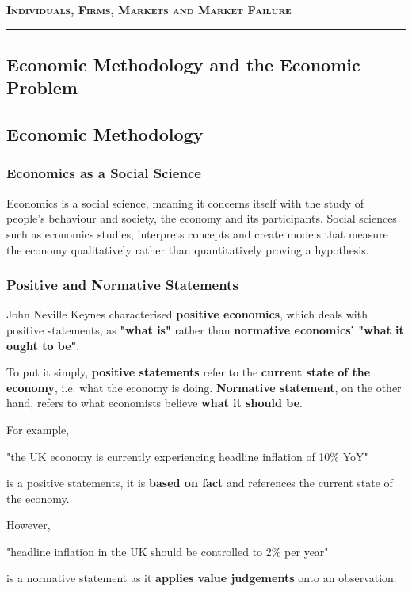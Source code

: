 \documentclass[a4paper,10pt]{article}
\begin{document}
{\LARGE\bfseries\scshape Individuals, Firms, Markets and Market Failure}

\vspace*{1em}\hrule\vspace*{1em}

\begin{multicols}{2}
	\tableofcontents

	\section{Economic Methodology and the Economic Problem}
	\subsection{Economic Methodology}

	\subsubsection{Economics as a Social Science}
	Economics is a social science, meaning it concerns itself with the study of
	people's behaviour and society, the economy and its participants. Social
	sciences such as economics studies, interprets concepts and create models that
	measure the economy qualitatively rather than quantitatively proving a
	hypothesis.

	\subsubsection{Positive and Normative Statements}
	John Neville Keynes characterised \textbf{positive economics}, which deals with positive statements, as \textbf{"what is"} rather than \textbf{normative economics' "what it ought to be"}.
	\medskip

	To put it simply, \textbf{positive statements} refer to the \textbf{current state of the economy}, i.e. what the economy is doing. \textbf{Normative statement}, on the other hand, refers to what economists believe \textbf{what it should be}.
	\medskip

	For example,
	\begin{center}
		\parbox{0.75\linewidth}{"the UK economy is currently experiencing headline inflation of 10\% YoY"}
	\end{center}
	is a positive statements, it is \textbf{based on fact} and references the current state of the economy.
	\medskip

	However,
	\begin{center}
		\parbox{0.75\linewidth}{"headline inflation in the UK should be controlled to 2\% per year"}
	\end{center}
	is a normative statement as it \textbf{applies value judgements} onto an observation.


\end{multicols}
\end{document}
